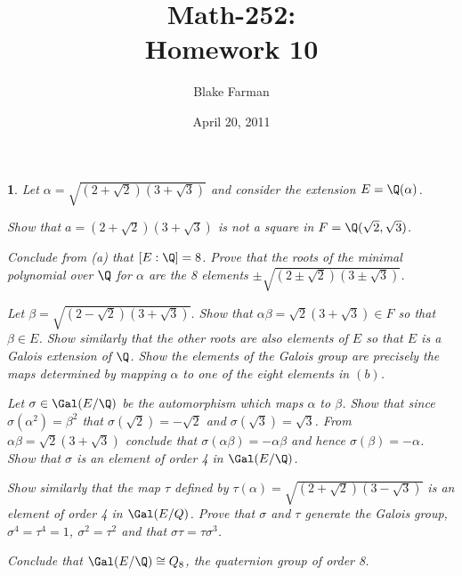 \documentclass[10pt]{amsart}
\author{Blake Farman}
\title{Math-252:\\Homework 10}
\date{April 20, 2011}
\begin{document}
\maketitle

\newtheorem{thm}{}

\begin{thm}
  \label{Ex1}
  Let $\alpha = \sqrt{(2 + \sqrt{2})(3 + \sqrt{3})}$ and consider the extension $E = \Q(\alpha)$.
  \begin{alphaenum}
    \item
      Show that $a = (2+\sqrt{2})(3 + \sqrt{3})$ is not a square in $F = \Q(\sqrt{2},\sqrt{3})$.
    \item
      Conclude from (a) that $[E:\Q] = 8$.
      Prove that the roots of the minimal polynomial over $\Q$ for $\alpha$ are the 8 elements $\pm\sqrt{(2 \pm \sqrt{2})(3 \pm \sqrt{3})}$.
    \item
      Let $\beta = \sqrt{(2 - \sqrt{2})(3 +\sqrt{3})}$.
      Show that $\alpha\beta = \sqrt{2}(3 + \sqrt{3}) \in F$ so that $\beta \in E$.
      Show similarly that the other roots are also elements of $E$ so that $E$ is a Galois extension of $\Q$.
      Show the elements of the Galois group are precisely the maps determined by mapping $\alpha$ to one of the eight elements in $(b)$.
    \item
      Let $\sigma \in \Gal(E/\Q)$ be the automorphism which maps $\alpha$ to $\beta$.
      Show that since $\sigma(\alpha^2) = \beta^2$ that $\sigma(\sqrt{2}) = -\sqrt{2}$ and $\sigma(\sqrt{3}) = \sqrt{3}$.
      From $\alpha\beta = \sqrt{2}(3 + \sqrt{3})$ conclude that $\sigma(\alpha\beta) = -\alpha\beta$ and hence $\sigma(\beta) = -\alpha$.
      Show that $\sigma$ is an element of order 4 in $\Gal(E/\Q)$.
    \item
      Show similarly that the map $\tau$ defined by $\tau(\alpha) = \sqrt{(2 + \sqrt{2})(3 - \sqrt{3})}$ is an element of order 4 in $\Gal(E/Q)$.
      Prove that $\sigma$ and $\tau$ generate the Galois group, $\sigma^4 = \tau^4 = 1$, $\sigma^2 = \tau^2$ and that $\sigma\tau = \tau\sigma^3$.
    \item
      Conclude that $\Gal(E/\Q) \cong Q_8$, the quaternion group of order 8.
  \end{alphaenum}
  

\end{thm}
\end{document}
